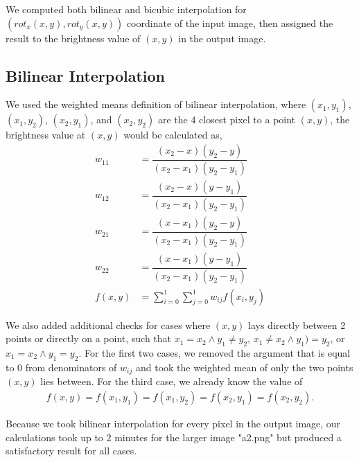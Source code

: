 \documentclass[conference]{IEEEtran}
\begin{document}
We computed both bilinear and bicubic interpolation for $(\textit{rot}_x(x,y), \textit{rot}_y(x,y)) $ coordinate of the input image, then assigned the result to the brightness value of $(x,y)$ in the output image.
\subsection{Bilinear Interpolation}
We used the weighted means definition of bilinear interpolation, where $(x_1, y_1)$, $(x_1, y_2)$, $(x_2, y_1)$, and $(x_2, y_2)$ are the 4 closest pixel to a point $(x, y)$, the brightness value at $(x, y)$ would be calculated as,
\begin{align}
	w_{11} &= \dfrac{(x_2-x)(y_2-y)}{(x_2-x_1)(y_2 - y_1)}\\
	w_{12} &= \dfrac{(x_2-x)(y-y_1)}{(x_2-x_1)(y_2 - y_1)}\\
	w_{21} &= \dfrac{(x-x_1)(y_2-y)}{(x_2-x_1)(y_2 - y_1)}\\
	w_{22} &= \dfrac{(x-x_1)(y-y_1)}{(x_2-x_1)(y_2 - y_1)}\\
	f(x,y) &= \sum^1_{i=0}\sum^1_{j=0}w_{ij}f(x_i, y_j)
\end{align}

We also added additional checks for cases where $(x, y)$ lays directly between 2 points or directly on a point, such that $x_1 = x_2\wedge y_1 \neq y_2$, $x_1 \neq x_2\wedge y_1 )= y_2$, or $x_1 = x_2\wedge y_1 = y_2$. For the first two cases, we removed the argument that is equal to 0 from denominators of $w_{ij}$ and took the weighted mean of only the two points $(x, y)$ lies between. For the third case, we already know the value of 
\begin{align}
	f(x,y) = f(x_1, y_1) = f(x_1, y_2) = f(x_2, y_1) = f(x_2, y_2).
\end{align}

Because we took bilinear interpolation for every pixel in the output image, our calculations took up to 2 minutes for the larger image "a2.png" but produced a satisfactory result for all cases.
\end{document}
